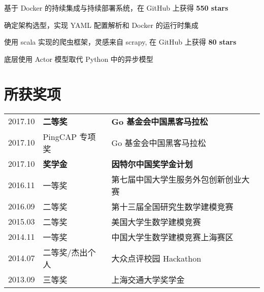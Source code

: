 \documentclass[]{deedy-resume-openfont}
\begin{document}
\begin{minipage}[t]{0.68\textwidth}



\begin{tightemize}
    \item 基于 Docker 的持续集成与持续部署系统，在 GitHub 上获得 \textbf{550 stars}
    \item 确定架构选型，实现 YAML 配置解析和 Docker 的运行时集成
    \end{tightemize}
\sectionsep

\begin{tightemize}
    \item 使用 scala 实现的爬虫框架，灵感来自 scrapy, 在 GitHub 上获得 \textbf{80 stars}
    \item 底层使用 Actor 模型取代 Python 中的异步模型
    \end{tightemize}
\sectionsep

\section{所获奖项}
\sectionsep
\begin{tabular}{rll}
2017.10     & \textbf{二等奖}  & \textbf{Go 基金会中国黑客马拉松} \\
2017.10     & PingCAP 专项奖 & Go 基金会中国黑客马拉松 \\
2017.10     & \textbf{奖学金}  & \textbf{因特尔中国奖学金计划} \\
2016.11	    & 一等奖  & 第七届中国大学生服务外包创新创业大赛 \\
2016.09	    & 二等奖  & 第十三届全国研究生数学建模竞赛 \\
2015.03	    & 二等奖  & 美国大学生数学建模竞赛 \\
2014.11     & 一等奖 & 中国大学生数学建模竞赛上海赛区 \\
2014.07	    & 二等奖/杰出个人  & 大众点评校园 Hackathon \\
2013.09     & 三等奖 & 上海交通大学奖学金 \\
\end{tabular}
\sectionsep


\end{minipage}
\end{document}
